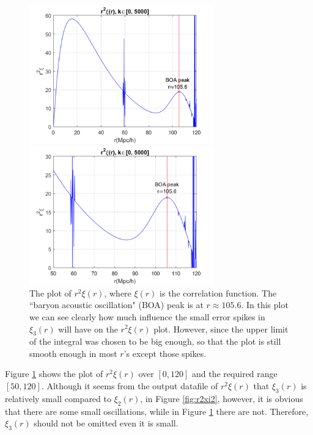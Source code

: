 \documentclass[12pt, graphicx]{article}
\begin{document}
\begin{figure}[ht]
\begin{minipage}{0.48\linewidth}
\centering
\includegraphics[width = 80mm]{r2xi_r_detailed.png}
\end{minipage}
\begin{minipage}{0.48\linewidth}
\centering
\includegraphics[width = 80mm]{r2xi_r_part_detailed.png}
\end{minipage}
\caption{The plot of $r^2\xi(r)$, where $\xi(r)$ is the correlation function. The \textquotedblleft baryon acoustic oscillation" (BOA) peak is at $r\approx105.6$. In this plot we can see clearly how much influence the small error spikes in $\xi_3(r)$ will have on the $r^2\xi(r)$ plot. However, since the upper limit of the integral was chosen to be big enough, so that the plot is still smooth enough in most $r$'s except those spikes.}
\label{fig:r2xi}
\end{figure}

Figure \ref{fig:r2xi} shows the plot of $r^2\xi(r)$ over $[0,120]$ and the required range $[50,120]$. Although it seems from the output datafile of $r^2\xi(r)$ that $\xi_3(r)$ is relatively small compared to $\xi_2(r)$, in Figure \ref{fig:r2xi2}, however, it is obvious that there are some small oscillations, while in Figure \ref{fig:r2xi} there are not. Therefore, $\xi_3(r)$ should not be omitted even it is small. 
\end{document}
